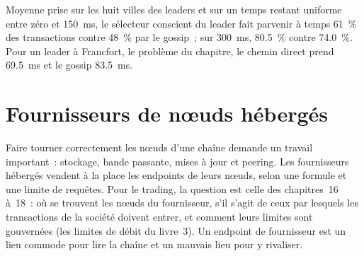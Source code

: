 \begin{omfigure}

\label{fig:nw:on-chain-connectivity:timely}
\end{omfigure}

Moyenne prise sur les huit villes des leaders et sur un temps restant uniforme entre zéro et \qty{150}{\milli\second}, le sélecteur conscient du leader fait parvenir à temps 61~\% des
transactions contre 48~\% par le gossip~; sur \qty{300}{\milli\second}, 80.5~\% contre 74.0~\%. Pour un leader à Francfort, le
problème du chapitre, le chemin direct prend \qty{69.5}{\milli\second} et le gossip \qty{83.5}{\milli\second}.

\section{Fournisseurs de nœuds hébergés}

Faire tourner correctement les nœuds d'une chaîne demande un travail important~: stockage, bande passante, mises à jour et peering. Les fournisseurs hébergés
vendent à la place les endpoints de leurs nœuds, selon une formule et une limite de requêtes. Pour le trading, la question est celle des chapitres~16 à~18~: où se trouvent
les nœuds du fournisseur, s'il s'agit de ceux par lesquels les transactions de la société doivent entrer, et comment leurs limites sont gouvernées (les limites de débit du livre~3). Un
endpoint de fournisseur est un lieu commode pour lire la chaîne et un mauvais lieu pour y rivaliser.


